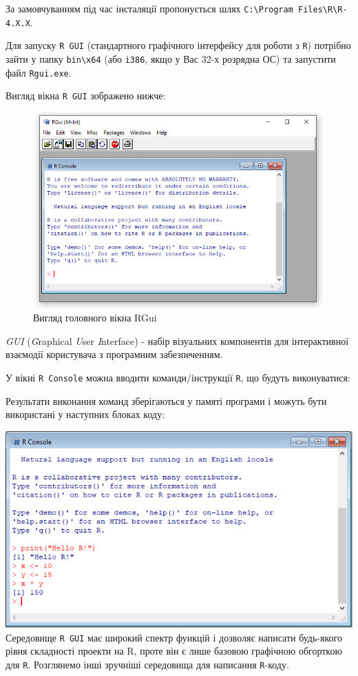 \documentclass[
]{book}
\begin{document}
За замовчуванням під час інсталяції пропонується шлях \texttt{C:\textbackslash{}Program\ Files\textbackslash{}R\textbackslash{}R-4.X.X}.

Для запуску \texttt{R\ GUI} (стандартного графічного інтерфейсу для роботи з \texttt{R}) потрібно зайти у папку \texttt{bin\textbackslash{}x64} (або \texttt{i386}, якщо у Вас 32-х розрядна ОС) та запустити файл \texttt{Rgui.exe}.

Вигляд вікна \texttt{R\ GUI} зображено нижче:

\begin{figure}
\centering
\includegraphics{images/chapter1/r_gui_4.png}
\caption{\label{fig:unnamed-chunk-5}Вигляд головного вікна RGui}
\end{figure}

\emph{GUI} (\emph{G}raphical \emph{U}ser \emph{I}nterface) - набір візуальних компонентів для інтерактивної взаємодії користувача з програмним забезпеченням.

У вікні \texttt{R\ Console} можна вводити команди/інструкції \texttt{R}, що будуть виконуватися:

Результати виконання команд зберігаються у памяті програми і можуть бути використані у наступних блоках коду:

\includegraphics{images/chapter1/r_gui_5.png}
Середовище \texttt{R\ GUI} має широкий спектр функцій і дозволяє написати будь-якого рівня складності проекти на R, проте він є лише базовою графічною обгорткою для \texttt{R}. Розглянемо інші зручніші середовища для написання \texttt{R}-коду.
\end{document}
